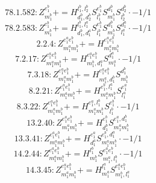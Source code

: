 \documentclass[letterpaper,10pt,fleqn,leqno,onecolumn]{article}
\begin{document}
\begin{equation} \;\;\;\;\;\;  78.1.582: Z^{e_{1}^{b}}_{m_{1}^{b}}+=H^{l_{1}^{b},l_{2}^{b}}_{d_{1}^{b},d_{2}^{b}}S^{e_{1}^{b}}_{l_{1}^{b}}S^{d_{1}^{b}}_{m_{1}^{b}}S^{d_{2}^{b}}_{l_{2}^{b}}\cdot -1/1 \end{equation}
\begin{equation} \;\;\;\;\;\;  78.2.583: Z^{e_{1}^{b}}_{m_{1}^{b}}+=H^{l_{1}^{b},l_{1}^{a}}_{d_{1}^{b},d_{1}^{a}}S^{e_{1}^{b}}_{l_{1}^{b}}S^{d_{1}^{b}}_{m_{1}^{b}}S^{d_{1}^{a}}_{l_{1}^{a}}\cdot -1/1 \end{equation}
\begin{equation} \;\;\;\;\;\;  2.2.4: Z^{e_{1}^{a}e_{1}^{b}}_{m_{1}^{a}m_{1}^{b}}+=H^{e_{1}^{a}e_{1}^{b}}_{m_{1}^{a}m_{1}^{b}} \end{equation}
\begin{equation} \;\;\;\;\;\;  7.2.17: Z^{e_{1}^{a}e_{1}^{b}}_{m_{1}^{a}m_{1}^{b}}+=H^{e_{1}^{a}e_{1}^{b}}_{m_{1}^{b},d_{1}^{a}}S^{d_{1}^{a}}_{m_{1}^{a}}\cdot -1/1 \end{equation}
\begin{equation} \;\;\;\;\;\;  7.3.18: Z^{e_{1}^{a}e_{1}^{b}}_{m_{1}^{a}m_{1}^{b}}+=H^{e_{1}^{a}e_{1}^{b}}_{m_{1}^{a},d_{1}^{b}}S^{d_{1}^{b}}_{m_{1}^{b}} \end{equation}
\begin{equation} \;\;\;\;\;\;  8.2.21: Z^{e_{1}^{a}e_{1}^{b}}_{m_{1}^{a}m_{1}^{b}}+=H^{e_{1}^{b},l_{1}^{a}}_{m_{1}^{a}m_{1}^{b}}S^{e_{1}^{a}}_{l_{1}^{a}} \end{equation}
\begin{equation} \;\;\;\;\;\;  8.3.22: Z^{e_{1}^{a}e_{1}^{b}}_{m_{1}^{a}m_{1}^{b}}+=H^{e_{1}^{a},l_{1}^{b}}_{m_{1}^{a}m_{1}^{b}}S^{e_{1}^{b}}_{l_{1}^{b}}\cdot -1/1 \end{equation}
\begin{equation} \;\;\;\;\;\;  13.2.40: Z^{e_{1}^{a}e_{1}^{b}}_{m_{1}^{a}m_{1}^{b}}+=H^{e_{1}^{b}}_{d_{1}^{b}}S^{e_{1}^{a},d_{1}^{b}}_{m_{1}^{a}m_{1}^{b}} \end{equation}
\begin{equation} \;\;\;\;\;\;  13.3.41: Z^{e_{1}^{a}e_{1}^{b}}_{m_{1}^{a}m_{1}^{b}}+=H^{e_{1}^{a}}_{d_{1}^{a}}S^{e_{1}^{b},d_{1}^{a}}_{m_{1}^{a}m_{1}^{b}}\cdot -1/1 \end{equation}
\begin{equation} \;\;\;\;\;\;  14.2.44: Z^{e_{1}^{a}e_{1}^{b}}_{m_{1}^{a}m_{1}^{b}}+=H^{l_{1}^{b}}_{m_{1}^{b}}S^{e_{1}^{a}e_{1}^{b}}_{m_{1}^{a},l_{1}^{b}}\cdot -1/1 \end{equation}
\begin{equation} \;\;\;\;\;\;  14.3.45: Z^{e_{1}^{a}e_{1}^{b}}_{m_{1}^{a}m_{1}^{b}}+=H^{l_{1}^{a}}_{m_{1}^{a}}S^{e_{1}^{a}e_{1}^{b}}_{m_{1}^{b},l_{1}^{a}} \end{equation}
\end{document}
